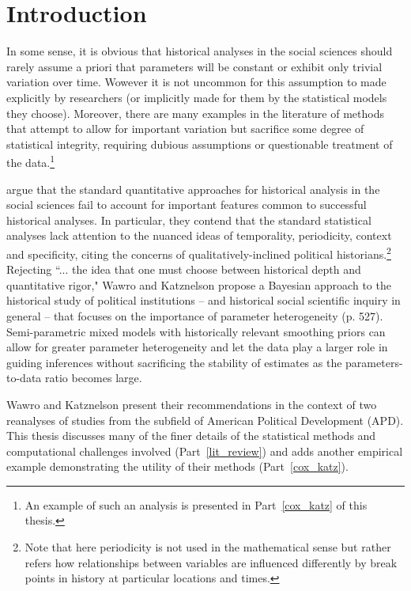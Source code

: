 \chapter{Introduction}
\label{introduction}

In some sense, it is obvious that historical analyses in the social sciences should rarely assume a priori that parameters will be constant or exhibit only trivial variation over time. Wowever it is not uncommon for this assumption to made explicitly by researchers (or implicitly made for them by the statistical models they choose). Moreover, there are many examples in the literature of methods that attempt to allow for important variation but sacrifice some degree of statistical integrity, requiring dubious assumptions or questionable treatment of the data.\footnote{An example of such an analysis is presented in Part~\ref{cox_katz} of this thesis.}  

 argue that the standard quantitative approaches for historical analysis in the social sciences fail to account for important features common to successful historical analyses. In particular, they contend that the standard statistical analyses lack attention to the nuanced ideas of temporality, periodicity, context and specificity, citing the concerns of qualitatively-inclined political historians.\footnote{Note that here periodicity is not used in the mathematical sense but rather refers how relationships between variables are influenced differently by break points in history at particular locations and times.}  Rejecting ``... the idea that one must choose between historical depth and quantitative rigor," Wawro and Katznelson propose a Bayesian approach to the historical study of political institutions -- and historical social scientific inquiry in general --  that focuses on the importance of parameter heterogeneity (p. 527). Semi-parametric mixed models with historically relevant smoothing priors can allow for greater parameter heterogeneity and let the data play a larger role in guiding inferences without sacrificing the stability of estimates as the parameters-to-data ratio becomes large.  

Wawro and Katznelson present their recommendations in the context of two reanalyses of studies from the subfield of American Political Development (APD). This thesis discusses many of the finer details of the statistical methods and computational challenges involved (Part~\ref{lit_review}) and adds another empirical example demonstrating the utility of their methods (Part~\ref{cox_katz}). 
